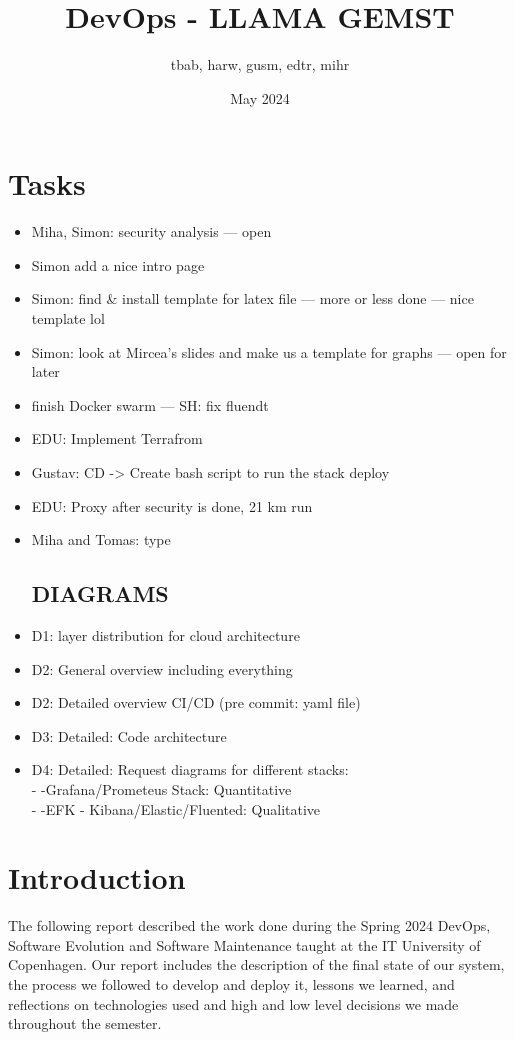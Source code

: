 \documentclass{article}
\title{DevOps - LLAMA GEMST}
\author{tbab, harw, gusm, edtr, mihr}
\date{May 2024}
\begin{document}
\maketitle

\section{Tasks}

\begin{itemize}
  \item Miha, Simon: security analysis — open
  \item Simon add a nice intro page
  \item Simon: find \& install template for latex file — more or less done — nice template lol
  \item Simon: look at Mircea's slides and make us a template for graphs — open for later
  \item finish Docker swarm — SH: fix fluendt 
    \item EDU: Implement Terrafrom
    \item Gustav: CD -> Create bash script to run the stack deploy
    \item EDU: Proxy after security is done, 21 km run
   \item Miha and Tomas: type

\subsection{DIAGRAMS}
 
    \item D1: layer distribution for cloud architecture 
    \item D2: General overview including everything 
    \item D2: Detailed overview CI/CD (pre commit: yaml file)
    \item D3: Detailed: Code architecture 
    \item D4: Detailed: Request diagrams for different stacks:
        \\ - -Grafana/Prometeus Stack: Quantitative 
        \\ - -EFK - Kibana/Elastic/Fluented: Qualitative

 \end{itemize}
\section{Introduction}
The following report described the work done during the Spring 2024 DevOps, Software Evolution and Software Maintenance taught at the IT University of Copenhagen. Our report includes the description of the final state of our system, the process we followed to develop and deploy it, lessons we learned, and reflections on technologies used and high and low level decisions we made throughout the semester.
\end{document}
